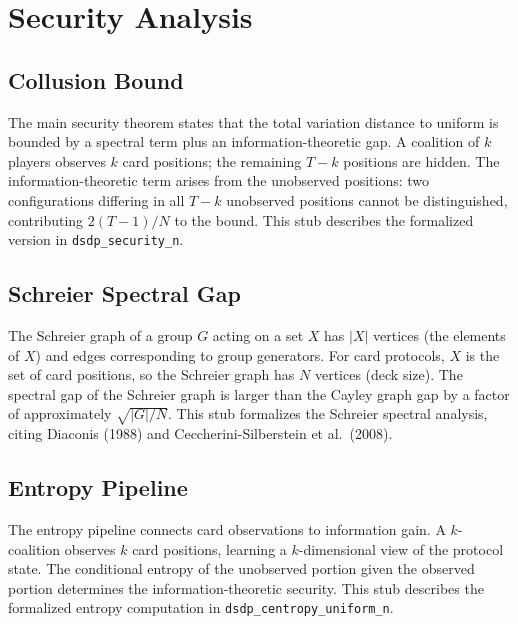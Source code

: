 \documentclass[11pt,a4paper]{article}
\begin{document}
\section{Security Analysis}
\label{sec:security}

\subsection{Collusion Bound}
\label{sec:collusion}

The main security theorem states that the total variation distance to uniform is bounded by a spectral term plus an information-theoretic gap.
A coalition of $k$ players observes $k$ card positions; the remaining $T - k$ positions are hidden.
The information-theoretic term arises from the unobserved positions: two configurations differing in all $T - k$ unobserved positions cannot be distinguished, contributing $2(T-1)/N$ to the bound.
This stub describes the formalized version in \texttt{dsdp\_security\_n}.

\subsection{Schreier Spectral Gap}
\label{sec:schreier}

The Schreier graph of a group $G$ acting on a set $X$ has $|X|$ vertices (the elements of $X$) and edges corresponding to group generators.
For card protocols, $X$ is the set of card positions, so the Schreier graph has $N$ vertices (deck size).
The spectral gap of the Schreier graph is larger than the Cayley graph gap by a factor of approximately $\sqrt{|G|/N}$.
This stub formalizes the Schreier spectral analysis, citing Diaconis (1988) and Ceccherini-Silberstein et al.\ (2008).

\subsection{Entropy Pipeline}
\label{sec:entropy}

The entropy pipeline connects card observations to information gain.
A $k$-coalition observes $k$ card positions, learning a $k$-dimensional view of the protocol state.
The conditional entropy of the unobserved portion given the observed portion determines the information-theoretic security.
This stub describes the formalized entropy computation in \texttt{dsdp\_centropy\_uniform\_n}.

\end{document}
